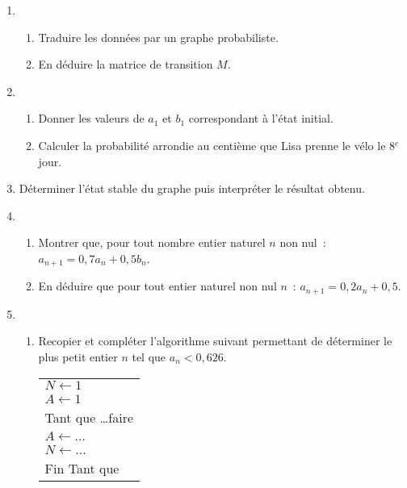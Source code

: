           \begin{enumerate}
               \item
               \begin{enumerate}[label=\alph*.]
                    \item Traduire les données par un graphe probabiliste.
                    \item En déduire la matrice de transition $M$.
               \end{enumerate}
               \item
               \begin{enumerate}[label=\alph*.]
                    \item Donner les valeurs de $a_1$ et $b_1$ correspondant à l'état initial.
                    \item Calculer la probabilité arrondie au centième que Lisa prenne le vélo le 8$^{e}$ jour.
               \end{enumerate}
               \item Déterminer l'état stable du graphe puis interpréter le résultat obtenu.
               \item
               \begin{enumerate}[label=\alph*.]
                    \item Montrer que, pour tout nombre entier naturel $n$ non nul~: $a_{n+1} = 0,7a_n + 0,5b_n$.
                    \item En déduire que pour tout entier naturel non nul $n$~: $a_{n+1} = 0,2a_n + 0,5$.
               \end{enumerate}
               \item
               \begin{enumerate}[label=\alph*.]
                    \item Recopier et compléter l'algorithme suivant permettant de déterminer le plus petit entier $n$ tel que $a_n < 0,626$.
                    \begin{center}
                      \begin{extern}%
                         \begin{tabularx}{0.3\linewidth}{|X|}\hline
                              $N \gets 1$\\
                              $A \gets 1$\\
                              Tant que \ldots faire\\
                              \hspace{1cm}$A \gets \ldots$\\
                              \hspace{1cm}$N \gets \ldots $\\
                              Fin Tant que\\ \hline
                         \end{tabularx}
                      \end{extern}
                      

\end{center}
\end{enumerate}
\end{enumerate}
